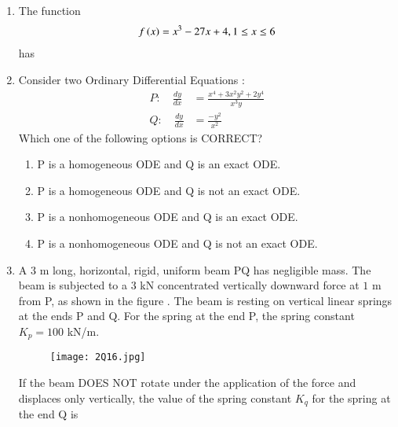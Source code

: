\documentclass[journal,12pt,onecolumn]{article}
\theoremstyle{remark}
\begin{document}
\begin{enumerate}
    \item The function 
    \begin{align}
    f\left(x\right) = x^3 - 27x + 4, 1 \leq x \leq 6
    \end{align}
    has
    
    \hfill{}
    \begin{enumerate}
    \end{enumerate}

    \item Consider two Ordinary Differential Equations :
    \begin{align}
    P\colon \quad \frac{dy}{dx} &= \frac{x^4+3x^2y^2+2y^4}{x^3y} \\
    Q\colon \quad \frac{dy}{dx} &= \frac{-y^2}{x^2}
    \end{align}
    Which one of the following options is CORRECT?
    
    \hfill{}
    \begin{enumerate}
        \item P is a homogeneous ODE and Q is an exact ODE.
        \item P is a homogeneous ODE and Q is not an exact ODE.
        \item P is a nonhomogeneous ODE and Q is an exact ODE.
        \item P is a nonhomogeneous ODE and Q is not an exact ODE.
    \end{enumerate}

    \item A $3$ m long, horizontal, rigid, uniform beam PQ has negligible mass. The beam is
    subjected to a $3$ kN concentrated vertically downward force at $1$ m from P, as shown in the figure . The beam is resting on vertical linear springs at the ends P and Q. For
    the spring at the end P, the spring constant $K_p = 100$ kN/m.
    \begin{figure}[H]
        \centering
        \texttt{[image: 2Q16.jpg]}
        \caption{}
        \label{fig:q16}
    \end{figure}
    If the beam DOES NOT rotate under the application of the force and displaces only
    vertically, the value of the spring constant $K_q$  for the spring at the end Q is
    

\end{enumerate}
\end{document}
